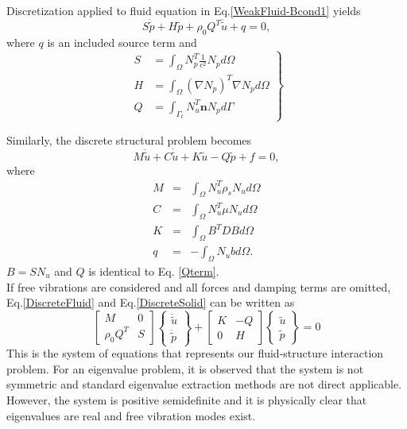 Discretization applied to fluid equation in Eq.\ref{WeakFluid-Bcond1} yields
\begin{equation}
S\ddot{\tilde{p}}+ H\tilde{p}+\rho_0 Q^T \ddot{\tilde{u}}+q = 0,
\label{DiscreteFluid}
\end{equation}
where $q$ is an included source term and
\begin{equation}
\left.
\begin{aligned}
S & = \int_\Omega N^T_p \frac{1}{c^2} N_p d\Omega \\ %
H & = \int_\Omega (\nabla N_p)^T \nabla N_p d\Omega\\
Q & = \int_{\Gamma_t} N^T_u \mathbf{n} N_p d\Gamma
\end{aligned}
\right\}
\label{Qterm}
\end{equation}

Similarly, the discrete structural problem becomes
\begin{equation}
M\ddot{\tilde{u}}+C\dot{\tilde{u}}+K\tilde{u}-Q\tilde{p}+f=0,
\label{DiscreteSolid}
\end{equation}
where
\begin{eqnarray*}
M & = & \int_\Omega N^T_u \rho_s N_u d\Omega\\
C & = & \int_\Omega N^T_u \mu N_u d\Omega\\
K & = & \int_\Omega B^T D B d\Omega\\
q & = & -\int_\Omega N_u b d\Omega.
\end{eqnarray*}
$B= SN_u$ and $Q$ is identical to Eq. \ref{Qterm}.\\

If free vibrations are considered and all forces and damping terms are omitted, Eq.\ref{DiscreteFluid} and Eq.\ref{DiscreteSolid} can be written as
\[
\begin{bmatrix}
M & 0\\
\rho_0 Q^T & S
\end{bmatrix}
\begin{Bmatrix}
\ddot{\tilde{u}}\\ \ddot{\tilde{p}}
\end{Bmatrix}
+\begin{bmatrix}
K & -Q\\
0 & H
\end{bmatrix}
\begin{Bmatrix}
\tilde{u}\\ \tilde{p}
\end{Bmatrix} = 0
\]
This is the system of equations that represents our fluid-structure interaction problem. For an eigenvalue problem, it is observed that the system is not symmetric and standard eigenvalue extraction methods are not direct applicable. However, the system is positive semidefinite and it is physically clear that eigenvalues are real and free vibration modes exist.
 
